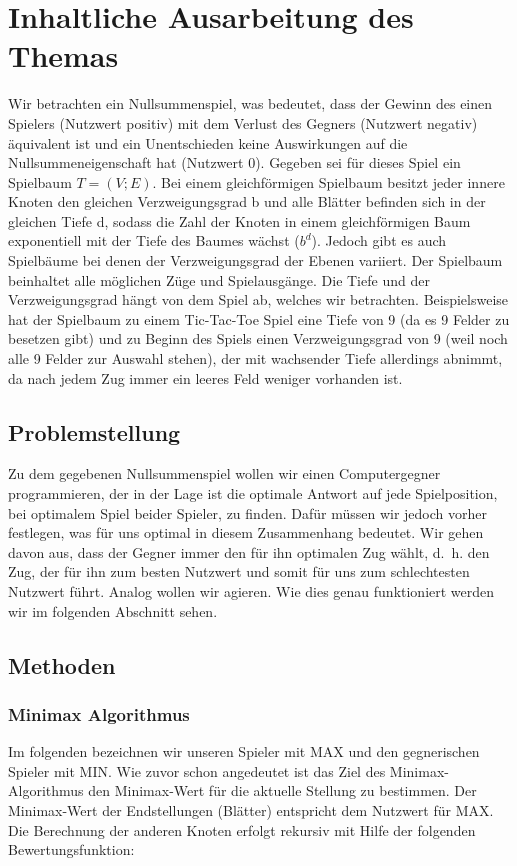 \section{Inhaltliche Ausarbeitung des Themas}

Wir betrachten ein Nullsummenspiel, was bedeutet, dass der Gewinn des einen Spielers (Nutzwert positiv) mit dem Verlust des Gegners (Nutzwert negativ) äquivalent ist und ein Unentschieden keine Auswirkungen auf die Nullsummeneigenschaft hat (Nutzwert 0).
Gegeben sei für dieses Spiel ein Spielbaum $T = (V;E)$. Bei einem gleichförmigen Spielbaum besitzt jeder innere Knoten den gleichen Verzweigungsgrad b und alle Blätter befinden sich in der gleichen Tiefe d, sodass die Zahl der Knoten in einem gleichförmigen Baum exponentiell mit der Tiefe des Baumes wächst ($b^d$). Jedoch gibt es auch Spielbäume bei denen der Verzweigungsgrad der Ebenen variiert.
Der Spielbaum beinhaltet alle möglichen Züge und Spielausgänge. Die Tiefe und der Verzweigungsgrad hängt von dem Spiel ab, welches wir betrachten. Beispielsweise hat der Spielbaum zu einem Tic-Tac-Toe Spiel eine Tiefe von 9 (da es 9 Felder zu besetzen gibt) und zu Beginn des Spiels einen Verzweigungsgrad von 9 (weil noch alle 9 Felder zur Auswahl stehen), der mit wachsender Tiefe allerdings abnimmt, da nach jedem Zug immer ein leeres Feld weniger vorhanden ist.



\subsection{Problemstellung}
Zu dem gegebenen Nullsummenspiel wollen wir einen Computergegner programmieren, der in der Lage ist die optimale Antwort auf jede Spielposition, bei optimalem Spiel beider Spieler, zu finden.
Dafür müssen wir jedoch vorher festlegen, was für uns optimal in diesem Zusammenhang bedeutet. Wir gehen davon aus, dass der Gegner immer den für ihn optimalen Zug wählt, d.~h. den Zug, der für ihn zum besten Nutzwert und somit für uns zum schlechtesten Nutzwert führt. Analog wollen wir agieren. Wie dies genau funktioniert werden wir im folgenden Abschnitt sehen.



\subsection{Methoden}


\subsubsection*{Minimax Algorithmus}
Im folgenden bezeichnen wir unseren Spieler mit MAX und den gegnerischen Spieler mit MIN. Wie zuvor schon angedeutet ist das Ziel des Minimax-Algorithmus den Minimax-Wert für die aktuelle Stellung zu bestimmen. Der Minimax-Wert der Endstellungen (Blätter) entspricht dem Nutzwert für MAX. Die Berechnung der anderen Knoten erfolgt rekursiv mit Hilfe der folgenden Bewertungsfunktion:

